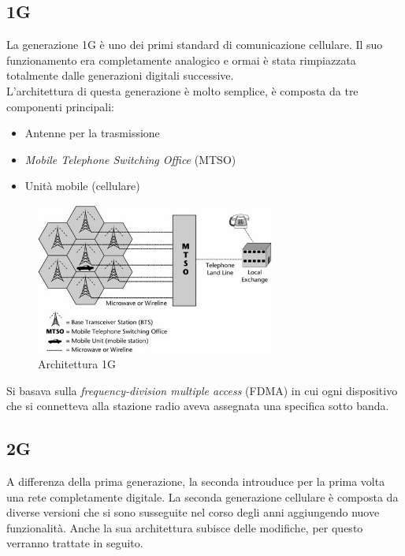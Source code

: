 \subsection{1G}
La generazione 1G è uno dei primi standard di comunicazione cellulare. Il suo funzionamento era completamente analogico 
e ormai è stata rimpiazzata totalmente dalle generazioni digitali successive.\\
L'architettura di questa generazione è molto semplice, è composta da tre componenti principali:
\begin{itemize}
    \item Antenne per la trasmissione
    \item \textit{Mobile Telephone Switching Office} (MTSO)
    \item Unità mobile (cellulare)
\end{itemize}
\begin{figure}[ht]
    \centering
    \includegraphics[width=0.7\textwidth]{images/1g.jpg}
    \caption{Architettura 1G}
\end{figure}
Si basava sulla \textit{frequency-division multiple access} (FDMA) in cui ogni dispositivo che si connetteva alla stazione radio
aveva assegnata una specifica sotto banda\cite{generations}.

\clearpage

\subsection{2G}
A differenza della prima generazione, la seconda introuduce per la prima volta una rete completamente digitale.
La seconda generazione cellulare è composta da diverse versioni che si sono susseguite nel corso degli anni aggiungendo nuove 
funzionalità.
Anche la sua architettura subisce delle modifiche, per questo verranno trattate in seguito.

